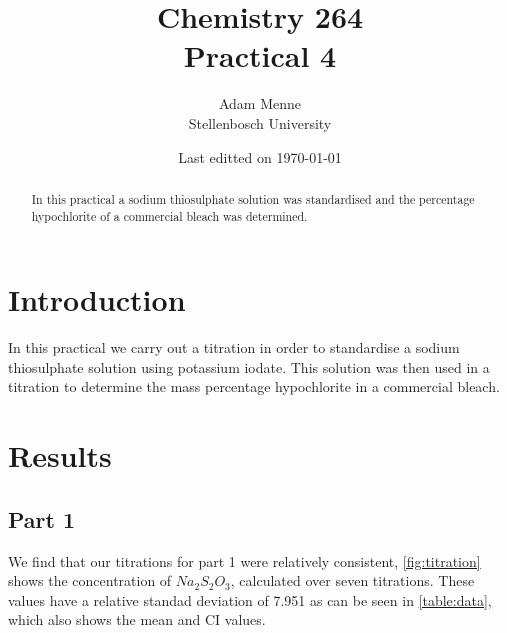\documentclass[a4paper, british]{article}
\title{Chemistry 264\\ Practical 4}
\date{Last editted on \today}
\author{Adam Menne\\ Stellenbosch University}
\begin{document}
\maketitle

\begin{abstract}
\noindent
In this practical a sodium thiosulphate solution was standardised and the percentage hypochlorite of a commercial bleach was determined.
\end{abstract}

\tableofcontents

\newpage

\section{Introduction}

In this practical we carry out a titration in order to standardise a sodium thiosulphate solution using potassium iodate. This solution was then used in a titration to determine the mass percentage hypochlorite in a commercial bleach.


\section{Results}

\subsection{Part 1}

We find that our titrations for part 1 were relatively consistent, \cref{fig:titration} shows the concentration of \(Na_2S_2O_3\), calculated over seven titrations. These values have a relative standad deviation of 7.951 as can be seen in \cref{table:data}, which also shows the mean and CI values.
\end{document}
